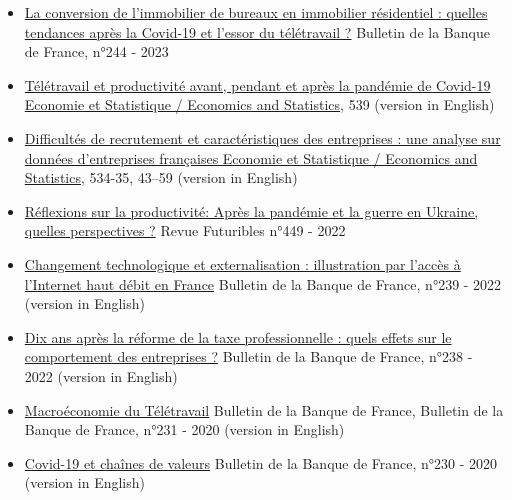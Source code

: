 \documentclass[12pt]{article}
\begin{document}
\begin{itemize}
\item \href{https://publications.banque-france.fr/la-conversion-de-limmobilier-de-bureaux-en-immobilier-residentiel-quelles-tendances-apres-la-covid}{La conversion de l’immobilier de bureaux en immobilier résidentiel : quelles tendances après la Covid-19 et l’essor du télétravail ?} Bulletin de la Banque de France, n°244 - 2023

\item \href{https://www.insee.fr/fr/statistiques/6791188}{Télétravail et productivité avant, pendant et après la pandémie de Covid-19  Economie et Statistique / Economics and Statistics}, 539 (version in English)

\item \href{https://www.insee.fr/fr/statistiques/6530513?sommaire=6530538}{Difficultés de recrutement et caractéristiques des entreprises : une analyse sur données d’entreprises françaises Economie et Statistique / Economics and Statistics}, 534-35, 43–59 (version in English)

\item \href{https://www.cairn.info/revue-futuribles-2022-4-page-55.htm}{Réflexions sur la productivité: Après la pandémie et la guerre en Ukraine, quelles perspectives ?} Revue Futuribles n°449 - 2022

\item \href{https://publications.banque-france.fr/changement-technologique-et-externalisation-illustration-par-lacces-linternet-haut-debit-en-france}{Changement technologique et externalisation : illustration par l’accès à l’Internet haut débit en France} Bulletin de la Banque de France, n°239 - 2022 (version in English)

\item \href{https://publications.banque-france.fr/dix-ans-apres-la-reforme-de-la-taxe-professionnelle-quels-effets-sur-le-comportement-des-entreprises}{Dix ans après la réforme de la taxe professionnelle : quels effets sur le comportement des entreprises ?} Bulletin de la Banque de France, n°238 - 2022 (version in English)

\item \href{https://publications.banque-france.fr/macroeconomie-du-teletravail}{Macroéconomie du Télétravail} Bulletin de la Banque de France, Bulletin de la Banque de France, n°231 - 2020 (version in English)

\item \href{https://publications.banque-france.fr/covid-19-et-chaines-de-valeur}{Covid-19 et chaînes de valeurs} Bulletin de la Banque de France, n°230 - 2020 (version in English)


\end{itemize}
\end{document}
